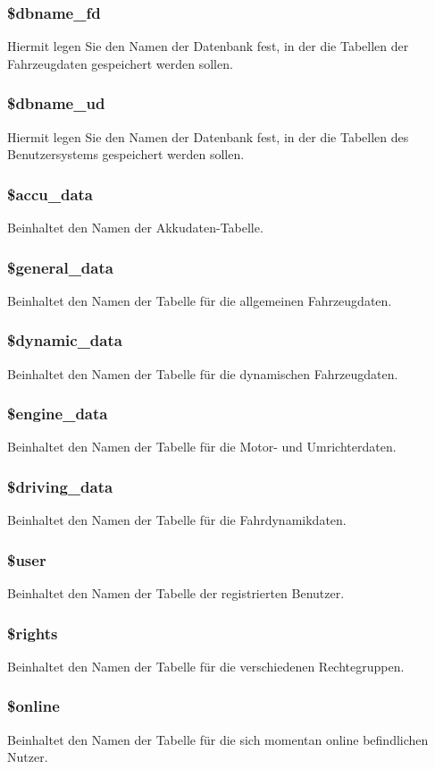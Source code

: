 \documentclass[fontsize = 12pt, paper = a4]{scrreprt}
\begin{document}
\subsubsection*{\$dbname\_fd}
Hiermit legen Sie den Namen der Datenbank fest, in der die Tabellen der Fahrzeugdaten gespeichert werden sollen.
\subsubsection*{\$dbname\_ud}
Hiermit legen Sie den Namen der Datenbank fest, in der die Tabellen des Benutzersystems gespeichert werden sollen.
\subsubsection*{\$accu\_data}
Beinhaltet den Namen der Akkudaten-Tabelle.
\subsubsection*{\$general\_data}
Beinhaltet den Namen der Tabelle für die allgemeinen Fahrzeugdaten.
\subsubsection*{\$dynamic\_data}
Beinhaltet den Namen der Tabelle für die dynamischen Fahrzeugdaten.
\subsubsection*{\$engine\_data}
Beinhaltet den Namen der Tabelle für die Motor- und Umrichterdaten.
\subsubsection*{\$driving\_data}
Beinhaltet den Namen der Tabelle für die Fahrdynamikdaten.
\subsubsection*{\$user}
Beinhaltet den Namen der Tabelle der registrierten Benutzer.
\subsubsection*{\$rights}
Beinhaltet den Namen der Tabelle für die verschiedenen Rechtegruppen.
\subsubsection*{\$online}
Beinhaltet den Namen der Tabelle für die sich momentan online befindlichen Nutzer.
\end{document}
